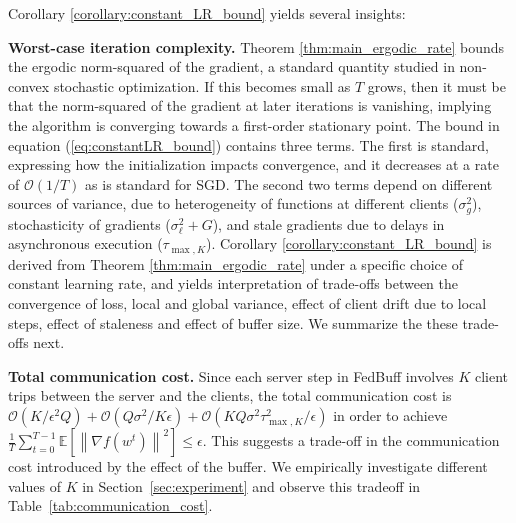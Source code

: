 \documentclass[twoside]{article}
\newcommand{\norm}[1]{\left\lVert#1\right\rVert}
\newcommand{\order}[1]{\mathcal{O}\left(#1\right)}
\newcommand{\algname}{{FedBuff}\xspace}
\begin{document}
Corollary \ref{corollary:constant_LR_bound} yields several insights:

\textbf{Worst-case iteration complexity. } Theorem \ref{thm:main_ergodic_rate} bounds the ergodic norm-squared of the gradient, a standard quantity studied in non-convex stochastic optimization. If this becomes small as $T$ grows, then it must be that the norm-squared of the gradient at later iterations is vanishing, implying the algorithm is converging towards a first-order stationary point. The bound in equation (\ref{eq:constantLR_bound}) contains three terms. The first is standard, expressing how the initialization impacts convergence, and it decreases at a rate of  $\order{1 / T}$ as is standard for SGD. The second two terms depend on different sources of variance, due to heterogeneity of functions at different clients ($\sigma^2_{g}$), stochasticity of gradients ($\sigma^2_{\ell} + G$), and stale gradients due to delays in asynchronous execution ($\tau_{\max, K}$). Corollary \ref{corollary:constant_LR_bound} is derived from Theorem \ref{thm:main_ergodic_rate} under a specific choice of constant learning rate, and yields interpretation of trade-offs between the convergence of loss, local and global variance, effect of client drift due to local steps, effect of staleness and effect of buffer size. We summarize the these trade-offs next. 


\textbf{Total communication cost.} Since each server step in \algname{} involves $K$ client trips between the server and the clients,  the total communication cost is $\order{K/\epsilon^2Q} + \order{Q\sigma^2 / K \epsilon} + \order{K Q\sigma^2 \tau^2_{\max, K} / \epsilon}$ in order to achieve $\frac{1}{T} \sum_{t=0}^{T-1} \mathbb{E}\left[\norm{\nabla f(w^t)}^2\right] \leq \epsilon$. This suggests a trade-off in the communication cost introduced by the effect of the buffer. We empirically investigate different values of $K$ in Section~\ref{sec:experiment} and observe this tradeoff in Table~\ref{tab:communication_cost}. 
\end{document}
